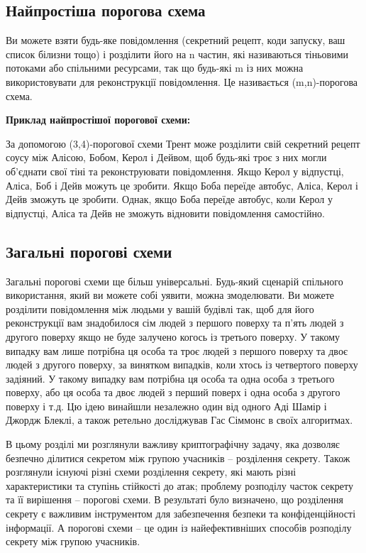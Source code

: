 \subsection{Найпростіша порогова схема}
Ви можете взяти будь-яке повідомлення (секретний рецепт, коди запуску, ваш список білизни тощо) і розділити його на n частин, які називаються тіньовими потоками або спільними ресурсами, так що будь-які m із них можна використовувати для реконструкції повідомлення. Це називається (m,n)-порогова схема.

\vspace{0.25cm}
\textbf{Приклад найпростішої порогової схеми:} \par
За допомогою (3,4)-порогової схеми Трент може розділити свій секретний рецепт соусу між Алісою, Бобом, Керол і Дейвом, щоб будь-які троє з них могли об’єднати свої тіні та реконструювати повідомлення. Якщо Керол у відпустці, Аліса, Боб і Дейв можуть це зробити. Якщо Боба переїде автобус, Аліса, Керол і Дейв зможуть це зробити. Однак, якщо Боба переїде автобус, коли Керол у відпустці, Аліса та Дейв не зможуть відновити повідомлення самостійно.

\subsection{Загальні порогові схеми}
Загальні порогові схеми ще більш універсальні. Будь-який сценарій спільного використання, який ви можете собі уявити, можна змоделювати. Ви можете розділити повідомлення між людьми у вашій будівлі так, щоб для його реконструкції вам знадобилося сім людей з першого поверху та п’ять людей з другого поверху якщо не буде залучено когось із третього поверху. У такому випадку вам лише потрібна ця особа та троє людей з першого поверху та двоє людей з другого поверху, за винятком випадків, коли хтось із четвертого поверху задіяний. У такому випадку вам потрібна ця особа та одна особа з третього поверху, або ця особа та двоє людей з перший поверх і одна особа з другого поверху і т.д.
Цю ідею винайшли незалежно один від одного Аді Шамір і  Джордж Блеклі, а також ретельно досліджував Гас Сіммонс в своїх алгоритмах.

\chapconclude{\ref{chap:review1}}

В цьому розділі ми розглянули важливу криптографічну задачу, яка дозволяє безпечно ділитися секретом між групою учасників -- розділення секрету. Також розглянули існуючі різні схеми розділення секрету, які мають різні характеристики та ступінь стійкості до атак; проблему розподілу часток секрету та її вирішення -- порогові схеми. В результаті було визначено, що розділення секрету є важливим інструментом для забезпечення безпеки та конфіденційності інформації. А порогові схеми -- це один із найефективніших способів розподілу секрету між групою учасників.